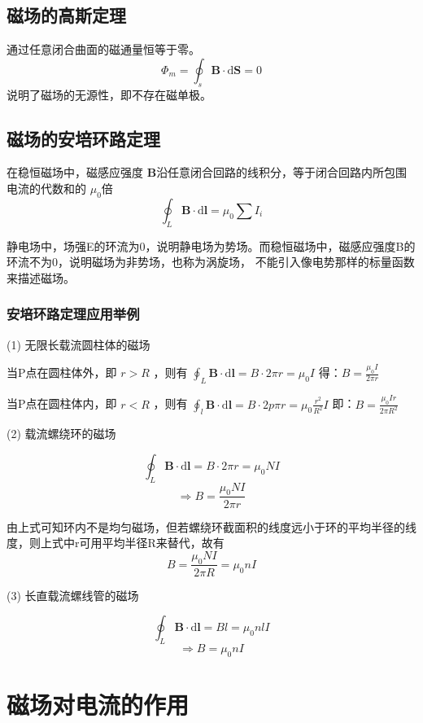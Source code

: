 \subsection{磁场的高斯定理}

通过任意闭合曲面的磁通量恒等于零。
$$
\Phi_{m}=\oint _{s}\boldsymbol{B}\cdot \mathrm{d}\boldsymbol{S}=0
$$
说明了磁场的无源性，即不存在磁单极。

\subsection{磁场的安培环路定理}

在稳恒磁场中，磁感应强度 $\boldsymbol{B}$沿任意闭合回路的线积分，等于闭合回路内所包围电流的代数和的 $\mu_0$倍
\begin{equation}
  \label{Ampere-circuital-theorem}
  \oint _{L}\boldsymbol{B}\cdot \mathrm{d} \boldsymbol{l}=\mu_0\sum I_{i}
\end{equation}

静电场中，场强E的环流为0，说明静电场为势场。而稳恒磁场中，磁感应强度B的环流不为0，说明磁场为非势场，也称为涡旋场，
不能引入像电势那样的标量函数来描述磁场。

\subsubsection{安培环路定理应用举例}

(1) 无限长载流圆柱体的磁场

当P点在圆柱体外，即 $r>R$ ，则有 $\displaystyle \oint_{L} \boldsymbol{B}\cdot \mathrm{d}\boldsymbol{l}=B\cdot 2\pi r=\mu_0I$
得：$\displaystyle B=\frac{\mu_0I}{2\pi r}$

当P点在圆柱体内，即 $r<R$ ，则有 $\displaystyle \oint_{l} \boldsymbol{B}\cdot \mathrm{d}\boldsymbol{l}=B\cdot 2p\pi r=\mu_0\frac{r^{2}}{R^{2}}I$
即：$\displaystyle B=\frac{\mu_0Ir}{2\pi R^{2}}$

(2) 载流螺绕环的磁场

$$
\oint_{L}\boldsymbol{B}\cdot \mathrm{d}\boldsymbol{l}=B\cdot 2\pi r=\mu_0NI
$$
$$
\Rightarrow B=\frac{\mu_0NI}{2\pi r}
$$

由上式可知环内不是均匀磁场，但若螺绕环截面积的线度远小于环的平均半径的线度，则上式中r可用平均半径R来替代，故有
$$
B=\frac{\mu_0NI}{2\pi R}=\mu_0nI
$$

(3) 长直载流螺线管的磁场

$$
\oint_{L}\boldsymbol{B}\cdot \mathrm{d}\boldsymbol{l}=Bl=\mu_0nlI
$$
$$
\Rightarrow B=\mu_0nI
$$

\section{磁场对电流的作用}
